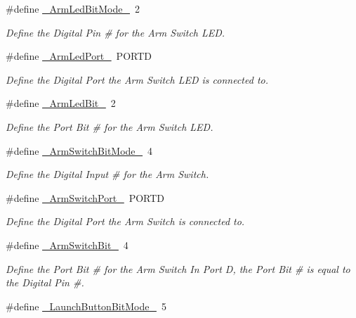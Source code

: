 \begin{DoxyCompactItemize}
\item 
\#define \hyperlink{remotePanel_8ino_a56e638ac4be5080bc22d2b94fb645c7e}{\-\_\-\-Arm\-Led\-Bit\-Mode\-\_\-}~2
\begin{DoxyCompactList}\small\item\em \-Define the \-Digital \-Pin \# for the \-Arm \-Switch \-L\-E\-D. \end{DoxyCompactList}\item 
\#define \hyperlink{remotePanel_8ino_ace3d99afc4b0ef3e41ab1238949d7f07}{\-\_\-\-Arm\-Led\-Port\-\_\-}~\-P\-O\-R\-T\-D
\begin{DoxyCompactList}\small\item\em \-Define the \-Digital \-Port the \-Arm \-Switch \-L\-E\-D is connected to. \end{DoxyCompactList}\item 
\#define \hyperlink{remotePanel_8ino_abeac387ee946b831a2d5f3ea8efa2cd6}{\-\_\-\-Arm\-Led\-Bit\-\_\-}~2
\begin{DoxyCompactList}\small\item\em \-Define the \-Port \-Bit \# for the \-Arm \-Switch \-L\-E\-D. \end{DoxyCompactList}\item 
\#define \hyperlink{remotePanel_8ino_a5f2f9a4205afa54acd635b5699e141b5}{\-\_\-\-Arm\-Switch\-Bit\-Mode\-\_\-}~4
\begin{DoxyCompactList}\small\item\em \-Define the \-Digital \-Input \# for the \-Arm \-Switch. \end{DoxyCompactList}\item 
\#define \hyperlink{remotePanel_8ino_a0e6aa72e91800dc38319f04a2c81f073}{\-\_\-\-Arm\-Switch\-Port\-\_\-}~\-P\-O\-R\-T\-D
\begin{DoxyCompactList}\small\item\em \-Define the \-Digital \-Port the \-Arm \-Switch is connected to. \end{DoxyCompactList}\item 
\#define \hyperlink{remotePanel_8ino_aceced00e366c0b2de5b1f6a45e857af2}{\-\_\-\-Arm\-Switch\-Bit\-\_\-}~4
\begin{DoxyCompactList}\small\item\em \-Define the \-Port \-Bit \# for the \-Arm \-Switch \-In \-Port \-D, the \-Port \-Bit \# is equal to the \-Digital \-Pin \#. \end{DoxyCompactList}\item 
\#define \hyperlink{remotePanel_8ino_adb250c5295e5075c2a2ba25ff9ea5f57}{\-\_\-\-Launch\-Button\-Bit\-Mode\-\_\-}~5

\end{DoxyCompactItemize}
